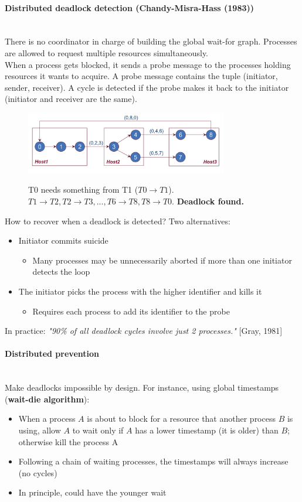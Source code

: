 \documentclass[10pt,a4paper]{article}
\newcommand{\myparagraph}[1]{\paragraph{#1}\mbox{}\\[0.05in]}
\begin{document}
\myparagraph{Distributed deadlock detection (Chandy-Misra-Hass (1983))}
There is no coordinator in charge of building the global wait-for graph. Processes are allowed to request multiple resources simultaneously. \\ When a process gets blocked, it sends a probe message to the processes holding resources it wants to acquire. A probe message contains the tuple (initiator, sender, receiver). A cycle is detected if the probe makes it back to the initiator (initiator and receiver are the same).
\begin{figure}[h!]
\hfill \includegraphics[width=250pt]{images/dist-det.png}\hspace*{\fill}
  \label{fig:dist-det}
  \caption{T0 needs something from T1 ($T0 \rightarrow T1$).\\ $T1 \rightarrow T2, T2 \rightarrow T3, ..., T6 \rightarrow T8, T8 \rightarrow T0$. \textbf{Deadlock found.}}
\end{figure}
How to recover when a deadlock is detected?
Two alternatives:
\begin{itemize}
	\item Initiator commits suicide
	\begin{itemize}
		\item Many processes may be unnecessarily aborted if more than one initiator detects the loop
	\end{itemize}
	\item The initiator picks the process with the higher identifier and kills it
	\begin{itemize}
		\item Requires each process to add its identifier to the probe
	\end{itemize}
\end{itemize}
In practice: \textit{"90\% of all deadlock cycles involve just 2 processes."} [Gray, 1981] \pagebreak
\myparagraph{Distributed prevention}
Make deadlocks impossible by design. For instance, using global timestamps (\textbf{wait-die algorithm}):
\begin{itemize}
	\item When a process $A$ is about to block for a resource that another process $B$ is using, allow $A$ to wait only if $A$ has a lower timestamp (it is older) than $B$; otherwise kill the process A
	\item Following a chain of waiting processes, the timestamps will always increase (no cycles)
	\item In principle, could have the younger wait
\end{itemize}
\end{document}
